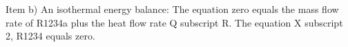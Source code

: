 Item b) An isothermal energy balance:
The equation zero equals the mass flow rate of R1234a plus the heat flow rate Q subscript R.
The equation X subscript 2, R1234 equals zero.